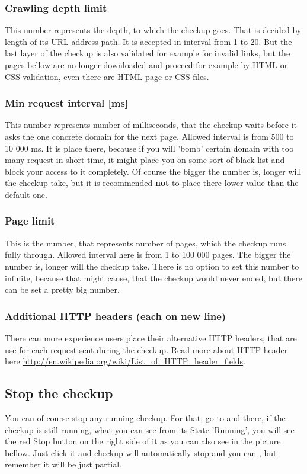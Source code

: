\documentclass[12pt,a4paper]{article}
\begin{document}
\subsubsection{Crawling depth limit}
This number represents the depth, to which the checkup goes. That is decided by length of its URL address path. It is accepted in interval from 1 to 20. But the last layer of the checkup is also validated for example for invalid links, but the pages bellow are no longer downloaded and proceed for example by HTML or CSS validation, even there are HTML page or CSS files.

\subsubsection{Min request interval [ms]}
This number represents number of milliseconds, that the checkup waits before it asks the one concrete domain for the next page. Allowed interval is from 500 to 10 000 ms. It is place there, because if you will 'bomb' certain domain with too many request in short time, it might place you on some sort of black list and block your access to it completely. Of course the bigger the number is, longer will the checkup take, but it is recommended \textbf{not} to place there lower value than the default one.

\subsubsection{Page limit}
This is the number, that represents number of pages, which the checkup runs fully through. Allowed interval here is from 1 to 100 000 pages. The bigger the number is, longer will the checkup take. There is no option to set this number to infinite, because that might cause, that the checkup would never ended, but there can be set a pretty big number.

\subsubsection{Additional HTTP headers (each on new line)}
There can more experience users place their alternative HTTP headers, that are use for each request sent during the checkup. Read more about HTTP header here \url{http://en.wikipedia.org/wiki/List_of_HTTP_header_fields}.

\subsection{Stop the checkup}
You can of course stop any running checkup. For that, go to  and there, if the checkup is still running, what you can see from its State 'Running', you will see the red Stop button on the right side of it as you can also see in the picture bellow. Just click it and checkup will automatically stop and you can , but remember it will be just partial.
\end{document}
